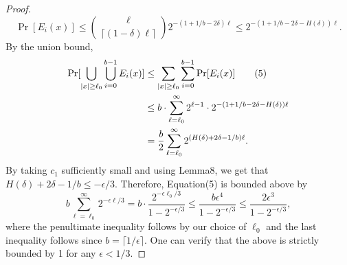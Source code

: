 \begin{proof}
\[
\Pr[E_i(x)]\le\binom\ell{\lceil(1-\delta)\ell\rceil}2^{-(1+1/b-2\delta)\ell}
\le2^{-(1+1/b-2\delta-H(\delta))\ell}.
\]
By the union bound,
\begin{align}
\Pr[\bigcup_{|x|\ge\ell_0}\bigcup_{i=0}^{b-1}E_i(x)]
&\le\sum_{|x|\ge\ell_0}\sum_{i=0}^{b-1}\Pr[E_i(x)]\tag{5}\\
&\le b\cdot\sum_{\ell=\ell_0}^\infty2^{\ell-1}\cdot2^{-(1+1/b-2\delta-H(\delta))\ell}\notag\\
&=\frac b2\sum_{\ell=\ell_0}^\infty2^{(H(\delta)+2\delta-1/b)\ell}.\notag
\end{align}
By taking $c_1$ sufficiently small and using Lemma8, we get that $H(\delta)+2\delta-1/b\le-\epsilon/3$. Therefore, Equation(5) is bounded above by
\[
b\sum_{\ell=\ell_0}^\infty2^{-\epsilon\ell/3}
=b\cdot\frac{2^{-\epsilon\ell_0/3}}{1-2^{-\epsilon/3}}
\le\frac{b\epsilon^4}{1-2^{-\epsilon/3}}
\le\frac{2\epsilon^3}{1-2^{-\epsilon/3}},
\]
where the penultimate inequality follows by our choice of $\ell_0$ and the last inequality follows since $b=\lceil1/\epsilon\rceil$. One can verify that the above is strictly bounded by 1 for any $\epsilon<1/3$.
\end{proof}
